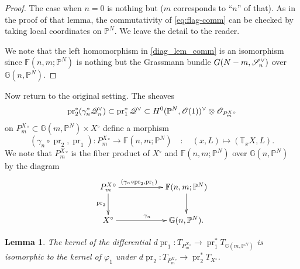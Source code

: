 \documentclass[a4paper,12pt]{amsart}
\theoremstyle{plain}
\newtheorem{lem}[lem]{Lemma}
\theoremstyle{definition}
\begin{document}
\begin{proof}
  
  The case when $n = 0$ is nothing but
  \cite[Lemma 2.6]{FI} ($m$ corresponds to ``$n$'' of that).
  As in the proof of that lemma,
  the commutativity of \autoref{eq:flag-comm} can be checked
  by taking local coordinates on ${\mathbb{P}}^N$.
  We leave the detail to the reader.
  
  We note that the left homomorphism in \autoref{diag_lem_comm} is an isomorphism since $\mathbb{F}(n,m ;{\mathbb{P}}^N)$ is nothing but the Grassmann bundle $G(N-m , {\mathscr{S}}_{n} \spcheck)$ over $ {\mathbb {G}}(n,{\mathbb{P}}^N)$.
\end{proof}

Now return to the original setting.
The sheaves
\[
\operatorname{pr}_2^* (\gamma_n^*{\mathscr{Q}}_{n}\spcheck) \subset \operatorname{pr}_1^* {\mathscr{Q}}^{\vee} \subset H^0 ({\mathbb{P}}^N,{\mathscr{O}}(1))^{\vee} \otimes {\mathscr{O}}_{{P_m^{X}}{^\circ}}
\]
on ${{P_m^{X}}{^\circ}} \subset {{\mathbb{G}}(m,{{\mathbb{P}}^N})} \times {X{^\circ}}$ define a morphism 
\[
(\gamma_n \circ \operatorname{pr}_2 , \operatorname{pr}_1) :  {{P_m^{X}}{^\circ}} {\rightarrow} \mathbb{F}(n,m ;{\mathbb{P}}^N) \quad : \quad (x,L) \mapsto ({\mathbb{T}}_x X, L).
\]
We note that ${{P_m^{X}}{^\circ}}$ is the fiber product of ${X{^\circ}}$ and $\mathbb{F}(n,m ;{\mathbb{P}}^N) $ over $ {\mathbb {G}}(n,{\mathbb{P}}^N)$ by the diagram
\begin{equation}\label{diag_fiber_product}
  \begin{aligned}
    \xymatrix{
      {{P_m^{X}}{^\circ}}  \ar[d]_{\operatorname{pr}_2} \ar[rr]^{\kern-2em(\gamma_n \circ \operatorname{pr}_2 , \operatorname{pr}_1) }
      & &  \mathbb{F}(n,m ;{\mathbb{P}}^N)   \ar[d]
      \\
      {X{^\circ}}  \ar[rr]^{\gamma_n}
      & & {\mathbb {G}}(n,{\mathbb{P}}^N).
    }   \end{aligned}
\end{equation}

\begin{lem}\label{calim_degeneracy_map}
  The kernel of the differential
  $d \operatorname{pr}_1 : T_{{P_m^{X}}{^\circ}} {\rightarrow} \operatorname{pr}_1^* T_{{\mathbb {G}}(m,{\mathbb{P}}^N)}$
  is isomorphic to the kernel of $\varphi_1$
  under $d \operatorname{pr}_2: T_{{P_m^{X}}{^\circ}} \rightarrow \operatorname{pr}_2^* T_{X{^\circ}}$.
\end{lem}
\end{document}
